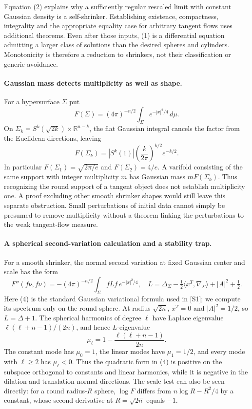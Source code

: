 \documentclass[11pt]{article}
\begin{document}
Equation (2) explains why a sufficiently regular rescaled limit with
constant Gaussian density is a self-shrinker. Establishing existence,
compactness, integrality and the appropriate equality case for arbitrary
tangent flows uses additional theorems. Even after those inputs, (1)
is a differential equation admitting a larger class of solutions than
the desired spheres and cylinders. Monotonicity is therefore a
reduction to shrinkers, not their classification or generic avoidance.

\paragraph{Gaussian mass detects multiplicity as well as shape.}
For a hypersurface $\Sigma$ put
\[
           F(\Sigma)=(4\pi)^{-n/2}
                        \int_\Sigma e^{-|x|^2/4}\,d\mu.
\]
On $\Sigma_k=S^k(\sqrt{2k})\times\mathbb R^{n-k}$, the flat Gaussian
integral cancels the factor from the Euclidean directions, leaving
\[
       F(\Sigma_k)=|S^k(1)|
              \left(\frac{k}{2\pi}\right)^{k/2}e^{-k/2}.
                                                               \tag{3}
\]
In particular $F(\Sigma_1)=\sqrt{2\pi/e}$ and
$F(\Sigma_2)=4/e$. A varifold consisting of the same support with
integer multiplicity $m$ has Gaussian mass $mF(\Sigma_k)$. Thus
recognizing the round support of a tangent object does not establish
multiplicity one. A proof excluding other smooth shrinker shapes
would still leave this separate obstruction. Small perturbations of
initial data cannot simply be presumed to remove multiplicity without
a theorem linking the perturbations to the weak tangent-flow measure.

\paragraph{A spherical second-variation calculation and a stability trap.}
For a smooth shrinker, the normal second variation at fixed Gaussian
center and scale has the form
\[
 F''(f\nu,f\nu)=-(4\pi)^{-n/2}\int_\Sigma fLf\,e^{-|x|^2/4},
 \quad L=\Delta_\Sigma-\tfrac12\langle x^T,\nabla_\Sigma\rangle
                  +|A|^2+\tfrac12.                           \tag{4}
\]
Here (4) is the standard Gaussian variational formula used in [S1]; we
compute its spectrum only on the round sphere. At radius $\sqrt{2n}$,
$x^T=0$ and $|A|^2=1/2$, so $L=\Delta+1$. The spherical harmonics of
degree $\ell$ have Laplace eigenvalue
$\ell(\ell+n-1)/(2n)$, and hence $L$-eigenvalue
\[
                   \mu_\ell=1-\frac{\ell(\ell+n-1)}{2n}.
                                                               \tag{5}
\]
The constant mode has $\mu_0=1$, the linear modes have $\mu_1=1/2$,
and every mode with $\ell\geq2$ has $\mu_\ell<0$. Thus the quadratic
form in (4) is positive on the subspace orthogonal to constants and
linear harmonics, while it is negative in the dilation and translation
normal directions. The scale test can also be seen directly: for a
round radius-$R$ sphere, $\log F$ differs from
$n\log R-R^2/4$ by a constant, whose second derivative at
$R=\sqrt{2n}$ equals $-1$.
\end{document}
